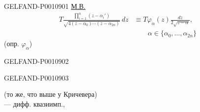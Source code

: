 \begin{GelfandAdjacentEvidence}{GELFAND-P001090}{1}
\uline{М.В.}
\begin{equation*}
\begin{aligned}
T\frac{\displaystyle\prod_{i=1}^{n}(z-\alpha_i')}
{\sqrt{4(z-\alpha_0)\cdots(z-\alpha_{2n})}}\,dz
&\equiv T\varphi_\alpha(z)\frac{dz}{2\sqrt{z-\alpha}},\\
&\hspace{2em}\alpha\in\{\alpha_0,\ldots,\alpha_{2n}\}
\end{aligned}
\tag{4}
\end{equation*}
(опр. $\varphi_\alpha$)
\end{GelfandAdjacentEvidence}
\begin{GelfandAdjacentEvidence}{GELFAND-P001090}{2}

\end{GelfandAdjacentEvidence}
\begin{GelfandAdjacentEvidence}{GELFAND-P001090}{3}


(то же, что выше у Кричевера)\\
— дифф. квазиимп.,
\end{GelfandAdjacentEvidence}

